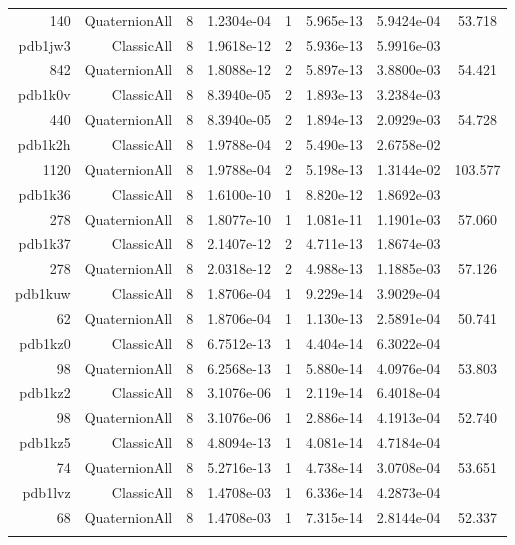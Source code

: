 \begin{xltabular}{\textwidth}{r|rcS[table-format=1.4e+2]cS[table-format=1.3e+2]S[table-format=1.4e+2]S[table-format=-1.3]}
140 & QuaternionAll & 8 & 1.2304e-04 & 1 & 5.965e-13 & 5.9424e-04 & 53.718\\  \addlinespace
pdb1jw3 & ClassicAll & 8 & 1.9618e-12 & 2 & 5.936e-13 & 5.9916e-03 & \\
842 & QuaternionAll & 8 & 1.8088e-12 & 2 & 5.897e-13 & 3.8800e-03 & 54.421\\  \addlinespace
pdb1k0v & ClassicAll & 8 & 8.3940e-05 & 2 & 1.893e-13 & 3.2384e-03 & \\
440 & QuaternionAll & 8 & 8.3940e-05 & 2 & 1.894e-13 & 2.0929e-03 & 54.728\\  \addlinespace
pdb1k2h & ClassicAll & 8 & 1.9788e-04 & 2 & 5.490e-13 & 2.6758e-02 & \\
1120 & QuaternionAll & 8 & 1.9788e-04 & 2 & 5.198e-13 & 1.3144e-02 & 103.577\\  \addlinespace
pdb1k36 & ClassicAll & 8 & 1.6100e-10 & 1 & 8.820e-12 & 1.8692e-03 & \\
278 & QuaternionAll & 8 & 1.8077e-10 & 1 & 1.081e-11 & 1.1901e-03 & 57.060\\  \addlinespace
pdb1k37 & ClassicAll & 8 & 2.1407e-12 & 2 & 4.711e-13 & 1.8674e-03 & \\
278 & QuaternionAll & 8 & 2.0318e-12 & 2 & 4.988e-13 & 1.1885e-03 & 57.126\\  \addlinespace
pdb1kuw & ClassicAll & 8 & 1.8706e-04 & 1 & 9.229e-14 & 3.9029e-04 & \\
62 & QuaternionAll & 8 & 1.8706e-04 & 1 & 1.130e-13 & 2.5891e-04 & 50.741\\  \addlinespace
pdb1kz0 & ClassicAll & 8 & 6.7512e-13 & 1 & 4.404e-14 & 6.3022e-04 & \\
98 & QuaternionAll & 8 & 6.2568e-13 & 1 & 5.880e-14 & 4.0976e-04 & 53.803\\  \addlinespace
pdb1kz2 & ClassicAll & 8 & 3.1076e-06 & 1 & 2.119e-14 & 6.4018e-04 & \\
98 & QuaternionAll & 8 & 3.1076e-06 & 1 & 2.886e-14 & 4.1913e-04 & 52.740\\  \addlinespace
pdb1kz5 & ClassicAll & 8 & 4.8094e-13 & 1 & 4.081e-14 & 4.7184e-04 & \\
74 & QuaternionAll & 8 & 5.2716e-13 & 1 & 4.738e-14 & 3.0708e-04 & 53.651\\  \addlinespace
pdb1lvz & ClassicAll & 8 & 1.4708e-03 & 1 & 6.336e-14 & 4.2873e-04 & \\
68 & QuaternionAll & 8 & 1.4708e-03 & 1 & 7.315e-14 & 2.8144e-04 & 52.337\\  \addlinespace

\end{xltabular}
